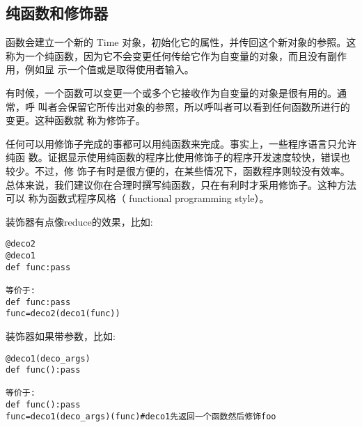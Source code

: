 \documentclass[twoside,11pt]{book}
\begin{document}
\subsection{纯函数和修饰器}
函数会建立一个新的 Time 对象，初始化它的属性，并传回这个新对象的参照。这
称为一个纯函数，因为它不会变更任何传给它作为自变量的对象，而且没有副作用，例如显
示一个值或是取得使用者输入。

有时候，一个函数可以变更一个或多个它接收作为自变量的对象是很有用的。通常，呼
叫者会保留它所传出对象的参照，所以呼叫者可以看到任何函数所进行的变更。这种函数就
称为修饰子。

任何可以用修饰子完成的事都可以用纯函数来完成。事实上，一些程序语言只允许纯函
数。证据显示使用纯函数的程序比使用修饰子的程序开发速度较快，错误也较少。不过，修
饰子有时是很方便的，在某些情况下，函数程序则较没有效率。
总体来说，我们建议你在合理时撰写纯函数，只在有利时才采用修饰子。这种方法可以
称为函数式程序风格（ functional programming style）。

装饰器有点像reduce的效果，比如:
\begin{lstlisting}
@deco2
@deco1
def func:pass

等价于:
def func:pass
func=deco2(deco1(func))
\end{lstlisting}

装饰器如果带参数，比如:
\begin{lstlisting}
@deco1(deco_args)
def func():pass

等价于:
def func():pass
func=deco1(deco_args)(func)#deco1先返回一个函数然后修饰foo
\end{lstlisting}
\end{document}
